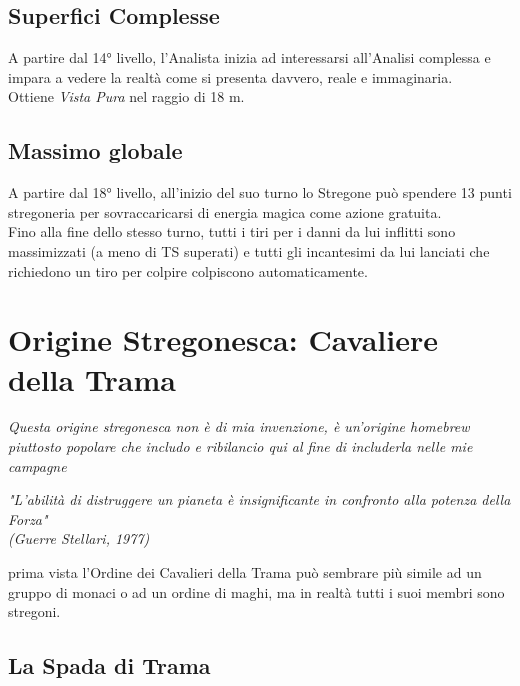 \subsection{Superfici Complesse}

A partire dal 14° livello, l'Analista inizia ad interessarsi all'Analisi complessa e impara a vedere la realtà come si presenta davvero, reale e immaginaria. \\ Ottiene \textit{Vista Pura} nel raggio di 18 m.

\subsection{Massimo globale}

A partire dal 18° livello, all'inizio del suo turno lo Stregone può spendere 13 punti stregoneria per sovraccaricarsi di energia magica come azione gratuita. \\ Fino alla fine dello stesso turno, tutti i tiri per i danni da lui inflitti sono massimizzati (a meno di TS superati) e tutti gli incantesimi da lui lanciati che richiedono un tiro per colpire colpiscono automaticamente.

\section{Origine Stregonesca: Cavaliere della Trama}
\textit{Questa origine stregonesca non è di mia invenzione, è un'origine homebrew piuttosto popolare che includo e ribilancio qui al fine di includerla nelle mie campagne}

\begin{DndReadAloud}
  \it
  "L'abilità di distruggere un pianeta è insignificante in confronto alla potenza della Forza" \\ (Guerre Stellari, 1977)
\end{DndReadAloud}

 prima vista l'Ordine dei Cavalieri della Trama può sembrare più simile ad un gruppo di monaci o ad un ordine di maghi, ma in realtà tutti i suoi membri sono stregoni.

\subsection{La Spada di Trama}

